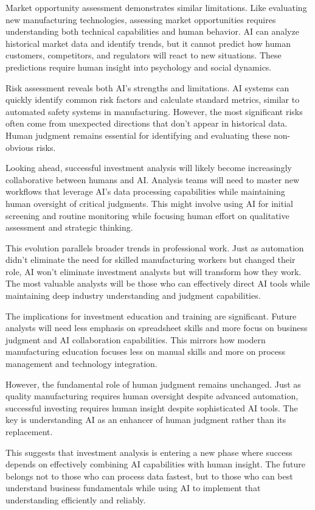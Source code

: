 \documentclass[
  Letterpaper,
]{scrbook}
\begin{document}
Market opportunity assessment demonstrates similar limitations. Like
evaluating new manufacturing technologies, assessing market
opportunities requires understanding both technical capabilities and
human behavior. AI can analyze historical market data and identify
trends, but it cannot predict how human customers, competitors, and
regulators will react to new situations. These predictions require human
insight into psychology and social dynamics.

Risk assessment reveals both AI's strengths and limitations. AI systems
can quickly identify common risk factors and calculate standard metrics,
similar to automated safety systems in manufacturing. However, the most
significant risks often come from unexpected directions that don't
appear in historical data. Human judgment remains essential for
identifying and evaluating these non-obvious risks.

Looking ahead, successful investment analysis will likely become
increasingly collaborative between humans and AI. Analysis teams will
need to master new workflows that leverage AI's data processing
capabilities while maintaining human oversight of critical judgments.
This might involve using AI for initial screening and routine monitoring
while focusing human effort on qualitative assessment and strategic
thinking.

This evolution parallels broader trends in professional work. Just as
automation didn't eliminate the need for skilled manufacturing workers
but changed their role, AI won't eliminate investment analysts but will
transform how they work. The most valuable analysts will be those who
can effectively direct AI tools while maintaining deep industry
understanding and judgment capabilities.

The implications for investment education and training are significant.
Future analysts will need less emphasis on spreadsheet skills and more
focus on business judgment and AI collaboration capabilities. This
mirrors how modern manufacturing education focuses less on manual skills
and more on process management and technology integration.

However, the fundamental role of human judgment remains unchanged. Just
as quality manufacturing requires human oversight despite advanced
automation, successful investing requires human insight despite
sophisticated AI tools. The key is understanding AI as an enhancer of
human judgment rather than its replacement.

This suggests that investment analysis is entering a new phase where
success depends on effectively combining AI capabilities with human
insight. The future belongs not to those who can process data fastest,
but to those who can best understand business fundamentals while using
AI to implement that understanding efficiently and reliably.
\end{document}
